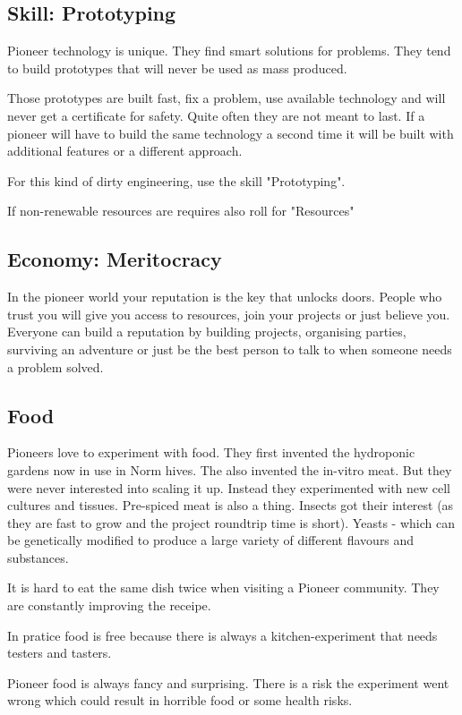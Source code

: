\subsection{Skill: Prototyping}

Pioneer technology is unique. They find smart solutions for problems. They tend to build prototypes that will never be used as mass produced.

Those prototypes are built fast, fix a problem, use available technology and will never get a certificate for safety.
Quite often they are not meant to last.
If a pioneer will have to build the same technology a second time it will be built with additional features or a different approach.

For this kind of dirty engineering, use the skill "Prototyping".

If non-renewable resources are requires also roll for "Resources"

\subsection{Economy: Meritocracy}
\label{sec:meritocracy}

In the pioneer world your reputation is the key that unlocks doors. People who trust you will give you access to resources, join your projects or just believe you.
Everyone can build a reputation by building projects, organising parties, surviving an adventure or just be the best person to talk to when someone needs a problem solved.

\subsection{Food}
\label{sec: pioneer food}

Pioneers love to experiment with food. They first invented the hydroponic gardens now in use in Norm hives. The also invented the in-vitro meat. But they were never interested into scaling it up. Instead they experimented with new cell cultures and tissues. Pre-spiced meat is also a thing.
Insects got their interest (as they are fast to grow and the project roundtrip time is short). Yeasts - which can be genetically modified to produce a large variety of different flavours and substances.

It is hard to eat the same dish twice when visiting a Pioneer community. They are constantly improving the receipe.

In pratice food is free because there is always a kitchen-experiment that needs testers and tasters.

Pioneer food is always fancy and surprising. There is a risk the experiment went wrong which could result in horrible food or some health risks.

